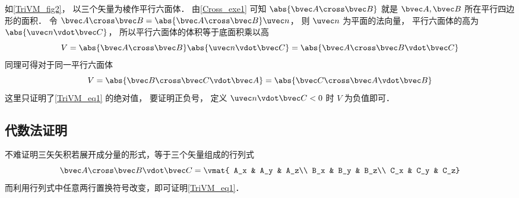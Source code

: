如\autoref{TriVM_fig2}， 以三个矢量为棱作平行六面体． 由\autoref{Cross_exe1} 可知 $\abs{\bvec A \cross \bvec B}$ 就是 $\bvec A,\bvec B$ 所在平行四边形的面积． 令 $\bvec A \cross \bvec B = \abs{\bvec A \cross \bvec B} \uvec n$， 则 $\uvec n$ 为平面的法向量， 平行六面体的高为 $\abs{\uvec n \vdot \bvec C}$， 所以平行六面体的体积等于底面积乘以高
\begin{equation}
V = \abs{\bvec A \cross \bvec B} \abs{\uvec n \vdot \bvec C} = \abs{\bvec A \cross \bvec B \vdot \bvec C}
\end{equation}
同理可得对于同一平行六面体
\begin{equation}
V = \abs{\bvec B \cross \bvec C \vdot \bvec A} = \abs{\bvec C \cross \bvec A \vdot \bvec B} 
\end{equation}  
这里只证明了\autoref{TriVM_eq1} 的绝对值， 要证明正负号， 定义 $\uvec n \vdot \bvec C < 0$ 时 $V$ 为负值即可．

\subsection{代数法证明}
不难证明三矢矢积若展开成分量的形式，等于三个矢量组成的行列式
\begin{equation}
\bvec A \cross \bvec B \vdot \bvec C = \vmat{
A_x & A_y & A_z\\
B_x & B_y & B_z\\
C_x & C_y & C_z}
\end{equation}
而利用行列式中任意两行置换符号改变，即可证明\autoref{TriVM_eq1}．


